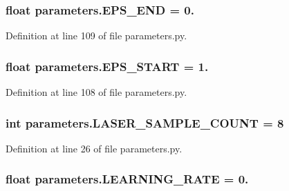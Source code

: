 \subsubsection[{\texorpdfstring{E\+P\+S\+\_\+\+E\+ND}{EPS_END}}]{\setlength{\rightskip}{0pt plus 5cm}float parameters.\+E\+P\+S\+\_\+\+E\+ND = 0.}\hypertarget{namespaceparameters_a3765f189d3af4815766ded3bffcba1e2}{}\label{namespaceparameters_a3765f189d3af4815766ded3bffcba1e2}


Definition at line 109 of file parameters.\+py.

\subsubsection[{\texorpdfstring{E\+P\+S\+\_\+\+S\+T\+A\+RT}{EPS_START}}]{\setlength{\rightskip}{0pt plus 5cm}float parameters.\+E\+P\+S\+\_\+\+S\+T\+A\+RT = 1.}\hypertarget{namespaceparameters_a371d0de003e9046dcc72450b7512ce14}{}\label{namespaceparameters_a371d0de003e9046dcc72450b7512ce14}


Definition at line 108 of file parameters.\+py.

\subsubsection[{\texorpdfstring{L\+A\+S\+E\+R\+\_\+\+S\+A\+M\+P\+L\+E\+\_\+\+C\+O\+U\+NT}{LASER_SAMPLE_COUNT}}]{\setlength{\rightskip}{0pt plus 5cm}int parameters.\+L\+A\+S\+E\+R\+\_\+\+S\+A\+M\+P\+L\+E\+\_\+\+C\+O\+U\+NT = 8}\hypertarget{namespaceparameters_a24735dce78cf9899cf1ec4bda2ea4eac}{}\label{namespaceparameters_a24735dce78cf9899cf1ec4bda2ea4eac}


Definition at line 26 of file parameters.\+py.

\subsubsection[{\texorpdfstring{L\+E\+A\+R\+N\+I\+N\+G\+\_\+\+R\+A\+TE}{LEARNING_RATE}}]{\setlength{\rightskip}{0pt plus 5cm}float parameters.\+L\+E\+A\+R\+N\+I\+N\+G\+\_\+\+R\+A\+TE = 0.}\hypertarget{namespaceparameters_afb996d542e8c3d3e8bbdfe4a711694dd}{}\label{namespaceparameters_afb996d542e8c3d3e8bbdfe4a711694dd}


